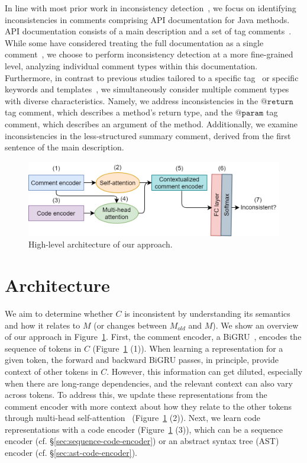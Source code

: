 \documentclass[letterpaper]{article} %
\makeatletter
\newcommand{\CodeIn}[1]{{\ifmmode{\mathtt{#1}}\else$\mathtt{#1}$\fi}}
\newcommand{\Return}{\CodeIn{@return}}
\newcommand{\Param}{\CodeIn{@param}}
\newcommand{\Comment}{$C$}
\newcommand{\OldCode}{$M_{old}$}
\newcommand{\NewCode}{$M$}
\makeatother
\begin{document}
In line with most prior work in inconsistency detection~\cite{Corazza18, icomment2007,tComment,Khamis2010AutomaticQA}, we focus on identifying inconsistencies in comments comprising API documentation for Java methods. API documentation consists of a main description and a set of tag comments~\cite{javadoc}. While some have considered treating the full documentation as a single comment~\cite{Corazza18}, we choose to perform inconsistency detection at a more fine-grained level, analyzing individual comment types within this documentation. Furthermore, in contrast to previous studies tailored to a specific tag~\cite{ZhouParameter, tComment} or specific keywords and templates~\cite{icomment2007,aComment}, we simultaneously consider multiple comment types with diverse characteristics. Namely, we address inconsistencies in the \Return{} tag comment, which describes a method's return type, and the \Param{} tag comment, which describes an argument of the method. Additionally, we examine inconsistencies in the less-structured summary comment, derived from the first sentence of the main description.





\begin{figure}
\centering
\includegraphics[width=\columnwidth]{images/architecture.png}
\vspace{-5pt}
\caption{High-level architecture of our approach.}
\label{fig:architecture}
\end{figure}

\section{Architecture}
We aim to determine whether \Comment{} is inconsistent by understanding its semantics
and how it relates to \NewCode{} (or changes between \OldCode{} and \NewCode{}). We show an overview of our approach in Figure~\ref{fig:architecture}. First, the comment encoder, a BiGRU~\cite{ChoGRU}, encodes the sequence of tokens in \Comment{} (Figure~\ref{fig:architecture} (1)).
When learning a representation for a given token, the forward and backward BiGRU passes, in principle, provide context of other tokens in \Comment{}. However, this information can get diluted, especially when there are long-range dependencies, and the relevant context can also vary across tokens. To address this, we update these representations from the comment encoder with more context about how they relate to the other tokens through multi-head self-attention~\cite{transformer} (Figure~\ref{fig:architecture} (2)). Next, we learn code representations with a code encoder (Figure~\ref{fig:architecture} (3)), which can be a sequence encoder (cf. \S\ref{sec:sequence-code-encoder}) or an abstract syntax tree (AST) encoder (cf. \S\ref{sec:ast-code-encoder}).
\end{document}
